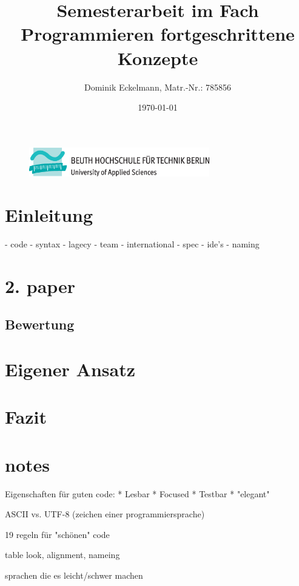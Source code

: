 \documentclass[a4paper]{article}
\title{Semesterarbeit im Fach Programmieren fortgeschrittene Konzepte}
\author{Dominik Eckelmann, Matr.-Nr.: 785856}
\date{\today}
\begin{document}
\sloppy

\begin{figure}[H]
	\centering
	\includegraphics[width=0.7\textwidth]{beuth.eps}
	\maketitle
\end{figure}

\newpage
\tableofcontents

\newpage
\section{Einleitung}


\cite{Knuth}
 - code
 - syntax
 - lagecy
 - team
 - international
 - spec
 - ide's
 - naming




\section{2. paper}

\subsection{Bewertung}

\section{Eigener Ansatz}

\section{Fazit}


\section{notes}
Eigenschaften für guten code: \cite{Heusser}
  * Lesbar
  * Focused
  * Testbar
  * "elegant"

ASCII vs. UTF-8 (zeichen einer programmiersprache) \cite{Kamp}

19 regeln für "schönen" code \cite{Peters}

table look, alignment, nameing \cite{Green}

sprachen die es leicht/schwer machen \cite{Spinellis}


\appendix

\newpage

\nocite{*}
 
\printbibliography
{}

\newpage
 
\listoffigures

\newpage
 
\renewcommand\listoflistingscaption{Quellcodeverzeichnis}
\listoflistings
\end{document}
